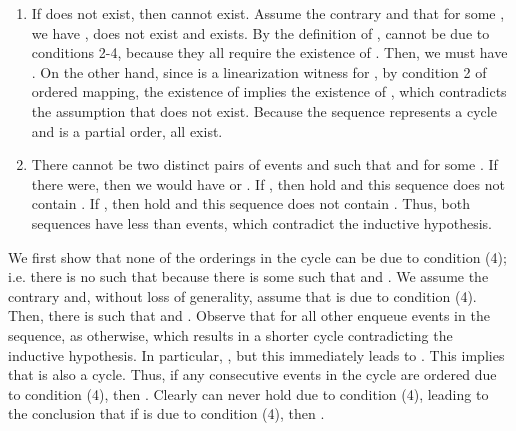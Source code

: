 \documentclass{LMCS}
\begin{document}
\begin{enumerate}
\item If  does not exist, then  cannot exist.
Assume the contrary and that for some , we have ,  does not exist and  exists.
By the definition of ,  cannot be due to conditions 2-4, because they all require the existence of .
Then, we must have .
On the other hand, since  is a linearization witness for , by condition 2 of ordered mapping, the existence of  implies the existence of , which contradicts the assumption that  does not exist.
Because the sequence represents a cycle and  is a partial order, all  exist.

\item There cannot be two distinct pairs of events  and  such that  and  for some .
If there were, then we would have  or .
If , then  hold and this sequence does not contain .
If , then  hold and this sequence does not contain .
Thus, both sequences have less than  events, which contradict the inductive hypothesis.
\end{enumerate}

\noindent We first show that none of the orderings in the cycle can be due to condition (4); i.e. there is no  such that  because there is some  such that  and . 
We assume the contrary and, without loss of generality, assume that  is due to condition (4).
Then, there is  such that  and .
Observe that for all other enqueue events  in the sequence,  as otherwise,  which results in a shorter cycle contradicting the inductive hypothesis.
In particular, , but this immediately leads to .
This implies that  is also a cycle.
Thus, if any consecutive events in the cycle are ordered due to condition (4), then .
Clearly  can never hold due to condition (4), leading to the conclusion that if  is due to condition (4), then .
\end{document}
